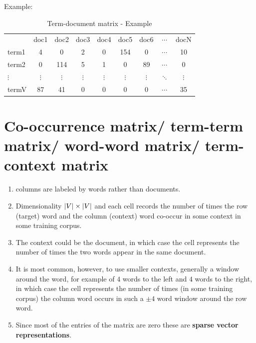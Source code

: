 Example:
\begin{table}[h]
    \centering
    \begin{tabular}{l c c c c c c c c}
         & doc1 & doc2 & doc3 & doc4 & doc5 & doc6 & $\cdots$ & docN \\
        term1 & 4 & 0 & 2 & 0 & 154 & 0 & $\cdots$ & 10 \\ 
        term2 & 0 & 114 & 5 & 1 & 0 & 89 & $\cdots$ & 0 \\ 
        $\vdots$ & $\vdots$ & $\vdots$ & $\vdots$ & $\vdots$ & $\vdots$ & $\vdots$ & $\ddots$ & $\vdots$ \\
        termV & 87 & 41 & 0 & 0 & 0 & 0 & $\cdots$ & 35 \\ 
    \end{tabular}
    \caption{Term-document matrix - Example}
\end{table}


\section{Co-occurrence matrix/ term-term matrix/ word-word matrix/ term-context matrix \cite{nlp-1}}\label{Co-occurrence matrix/ term-term matrix/ word-word matrix/ term-context matrix}

\begin{enumerate}
    \item columns are labeled by words rather than documents. 
    
    \item Dimensionality $\left| V \right|\times\left| V \right|$ and each cell records the number of times the row (target) word and the column (context) word co-occur in some context in some training corpus.

    \item The context could be the document, in which case the cell represents the number of times the two words appear in the same document.

    \item It is most common, however, to use smaller contexts, generally a window around the word, for example of $4$ words to the left and $4$ words to the right, in which case the cell represents the number of times (in some training corpus) the column word occurs in such a $\pm 4$ word window around the row word.

    \item Since most of the entries of the matrix are zero these are \textbf{sparse vector representations}.
\end{enumerate}

